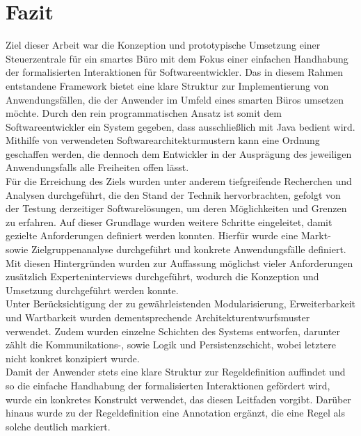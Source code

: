 \chapter{Fazit}
\label{chap:fazit}
    Ziel dieser Arbeit war die Konzeption und prototypische Umsetzung einer Steuerzentrale für ein 
    smartes Büro mit dem Fokus einer einfachen Handhabung der formalisierten Interaktionen für Softwareentwickler. 
    Das in diesem Rahmen entstandene Framework bietet eine klare Struktur zur Implementierung von Anwendungsfällen, die der Anwender 
    im Umfeld eines smarten Büros umsetzen möchte. Durch den rein programmatischen Ansatz ist somit 
    dem Softwareentwickler ein System gegeben, dass ausschließlich mit Java bedient wird. Mithilfe von verwendeten 
    Softwarearchitekturmustern kann eine Ordnung geschaffen werden, die dennoch dem Entwickler in der 
    Ausprägung des jeweiligen Anwendungsfalls alle Freiheiten offen lässt. 
    \\
    \linebreak 
    Für die Erreichung des Ziels wurden unter anderem tiefgreifende Recherchen und Analysen durchgeführt, die den Stand 
    der Technik hervorbrachten, gefolgt von der Testung derzeitiger Softwarelösungen, um deren Möglichkeiten und Grenzen zu erfahren. 
    Auf dieser Grundlage wurden weitere Schritte eingeleitet, damit gezielte Anforderungen definiert werden konnten. Hierfür wurde 
    eine Markt- sowie Zielgruppenanalyse durchgeführt und konkrete Anwendungsfälle definiert. Mit diesen Hintergründen wurden zur 
    Auffassung möglichst vieler Anforderungen zusätzlich Experteninterviews durchgeführt, wodurch die Konzeption und Umsetzung 
    durchgeführt werden konnte. 
    \\
    \linebreak
    Unter Berücksichtigung der zu gewährleistenden Modularisierung, Erweiterbarkeit und Wartbarkeit wurden dementsprechende 
    Architekturentwurfsmuster verwendet. Zudem wurden einzelne Schichten des Systems entworfen, darunter zählt die Kommunikations-, sowie 
    Logik und Persistenzschicht, wobei letztere nicht konkret konzipiert wurde.     
    \\
    Damit der Anwender stets eine klare Struktur zur Regeldefinition auffindet und so die einfache Handhabung der formalisierten Interaktionen gefördert wird, wurde 
    ein konkretes Konstrukt verwendet, das diesen Leitfaden vorgibt. Darüber hinaus wurde zu der Regeldefinition eine Annotation ergänzt, die eine Regel als solche 
    deutlich markiert.
    \\
